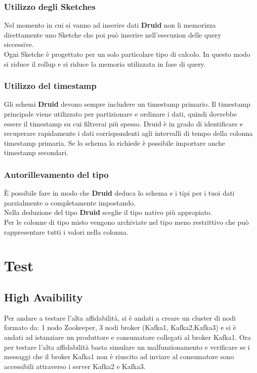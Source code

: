 \documentclass{article}
\begin{document}
\subsubsection{Utilizzo degli Sketches}
Nel momento in cui si vanno ad inserire dati \textbf{Druid} non li memorizza direttamente uno Sketche che poi può inserire nell'esecuzion delle query siccessive. \\Ogni Sketche è progettato per un solo particolare tipo di calcolo. In questo modo si riduce il rollup e si riduce la memoria utilizzata in fase di query.
\subsubsection{Utilizzo del timestamp}
Gli schemi \textbf{Druid} devono sempre includere un timestamp primario. Il timestamp principale viene utilizzato per partizionare e ordinare i dati, quindi dovrebbe essere il timestamp su cui filtrerai più spesso. Druid è in grado di identificare e recuperare rapidamente i dati corrispondenti agli intervalli di tempo della colonna timestamp primaria.
Se lo schema lo richiede è possibile importare anche timestamp secondari.
\subsubsection{Autorillevamento del tipo}
È possibile fare in modo che \textbf{Druid} deduca lo schema e i tipi per i tuoi dati parzialmente o completamente impostando. \\
Nella deduzione del tipo \textbf{Druid} sceglie il tipo nativo più appropiato.\\
Per le colonne di tipo misto vengono archiviate nel tipo meno restrittivo che può rappresentare tutti i valori nella colonna.
\section{Test}
\subsection{High Avaibility}
Per andare a testare l'alta affidabilità, si è andati a creare un cluster di nodi formato da: 1 nodo Zookeeper, 3 nodi broker (Kafka1, Kafka2,Kafka3) e si è andati ad istanziare un produttore e consumatore collegati al broker Kafka1. Ora per testare l'alta affidabilità basta simulare un malfunzionamento e verificare se i messaggi che il broker Kafka1 non è riuscito ad inviare al consumatore sono accessibili attraverso i server Kafka2 e Kafka3. 
\end{document}
